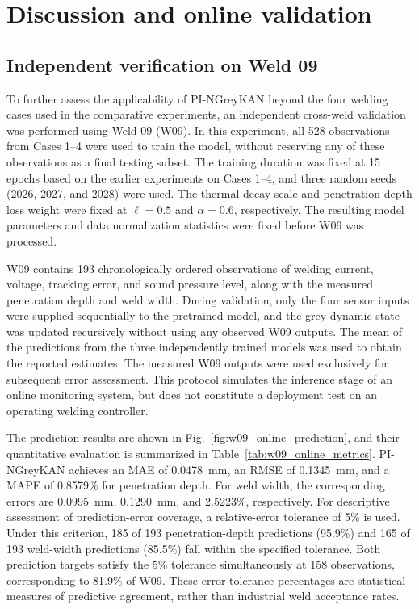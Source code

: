 \section{Discussion and online validation}
\label{sec:discussion_online}

\subsection{Independent verification on Weld 09}
\label{sec:w09_verification}

To further assess the applicability of PI-NGreyKAN beyond the four welding cases used in the comparative experiments, an independent cross-weld validation was performed using Weld 09 (W09). In this experiment, all 528 observations from Cases 1--4 were used to train the model, without reserving any of these observations as a final testing subset. The training duration was fixed at 15 epochs based on the earlier experiments on Cases 1--4, and three random seeds (2026, 2027, and 2028) were used. The thermal decay scale and penetration-depth loss weight were fixed at $\ell=0.5$ and $\alpha=0.6$, respectively. The resulting model parameters and data normalization statistics were fixed before W09 was processed.

W09 contains 193 chronologically ordered observations of welding current, voltage, tracking error, and sound pressure level, along with the measured penetration depth and weld width. During validation, only the four sensor inputs were supplied sequentially to the pretrained model, and the grey dynamic state was updated recursively without using any observed W09 outputs. The mean of the predictions from the three independently trained models was used to obtain the reported estimates. The measured W09 outputs were used exclusively for subsequent error assessment. This protocol simulates the inference stage of an online monitoring system, but does not constitute a deployment test on an operating welding controller.

The prediction results are shown in Fig.~\ref{fig:w09_online_prediction}, and their quantitative evaluation is summarized in Table~\ref{tab:w09_online_metrics}. PI-NGreyKAN achieves an MAE of 0.0478~mm, an RMSE of 0.1345~mm, and a MAPE of 0.8579\% for penetration depth. For weld width, the corresponding errors are 0.0995~mm, 0.1290~mm, and 2.5223\%, respectively. For descriptive assessment of prediction-error coverage, a relative-error tolerance of 5\% is used. Under this criterion, 185 of 193 penetration-depth predictions (95.9\%) and 165 of 193 weld-width predictions (85.5\%) fall within the specified tolerance. Both prediction targets satisfy the 5\% tolerance simultaneously at 158 observations, corresponding to 81.9\% of W09. These error-tolerance percentages are statistical measures of predictive agreement, rather than industrial weld acceptance rates.

